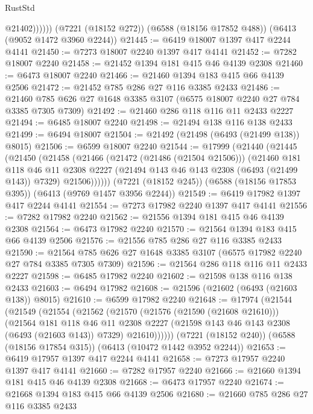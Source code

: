 \begin{lexlean}{RustStd}
\begin{coremodule}
                @21402))))))
    (@7221 (@18152 @272))
    (@6588 (@18156 @17852 @488))
    (@6413 (@9052 @1472 @3960 @2244))
@21445 := @6419 @18007 @1397 @417 @2244 @4141
@21450 := @7273 @18007 @2240 @1397 @417 @4141
@21452 := @7282 @18007 @2240
@21458 := @21452 @1394 @181 @415 @46 @4139 @2308
@21460 := @6473 @18007 @2240
@21466 := @21460 @1394 @183 @415 @66 @4139 @2506
@21472 := @21452 @785 @286 @27 @116 @3385 @2433
@21486 := @21460 @785 @626 @27 @1648 @3385 @3107 (@6575 @18007 @2240 @27 @784 @3385 @7305 @7309)
@21492 := @21460 @286 @118 @116 @11 @2433 @2227
@21494 := @6485 @18007 @2240
@21498 := @21494 @138 @116 @138 @2433
@21499 := @6494 @18007
@21504 := @21492 (@21498 (@6493 (@21499 @138)) @8015)
@21506 := @6599 @18007 @2240
@21544 := @17999
    (@21440
      (@21445
        (@21450
          (@21458
            (@21466
              (@21472 (@21486 (@21504 @21506)))
              (@21460
                @181
                @118
                @46
                @11
                @2308
                @2227
                (@21494 @143 @46 @143 @2308 (@6493 (@21499 @143)) @7329)
                @21506))))))
    (@7221 (@18152 @245))
    (@6588 (@18156 @17853 @395))
    (@6413 (@9769 @1457 @3956 @2244))
@21549 := @6419 @17982 @1397 @417 @2244 @4141
@21554 := @7273 @17982 @2240 @1397 @417 @4141
@21556 := @7282 @17982 @2240
@21562 := @21556 @1394 @181 @415 @46 @4139 @2308
@21564 := @6473 @17982 @2240
@21570 := @21564 @1394 @183 @415 @66 @4139 @2506
@21576 := @21556 @785 @286 @27 @116 @3385 @2433
@21590 := @21564 @785 @626 @27 @1648 @3385 @3107 (@6575 @17982 @2240 @27 @784 @3385 @7305 @7309)
@21596 := @21564 @286 @118 @116 @11 @2433 @2227
@21598 := @6485 @17982 @2240
@21602 := @21598 @138 @116 @138 @2433
@21603 := @6494 @17982
@21608 := @21596 (@21602 (@6493 (@21603 @138)) @8015)
@21610 := @6599 @17982 @2240
@21648 := @17974
    (@21544
      (@21549
        (@21554
          (@21562
            (@21570
              (@21576 (@21590 (@21608 @21610)))
              (@21564
                @181
                @118
                @46
                @11
                @2308
                @2227
                (@21598 @143 @46 @143 @2308 (@6493 (@21603 @143)) @7329)
                @21610))))))
    (@7221 (@18152 @240))
    (@6588 (@18156 @17854 @315))
    (@6413 (@10472 @1442 @3952 @2244))
@21653 := @6419 @17957 @1397 @417 @2244 @4141
@21658 := @7273 @17957 @2240 @1397 @417 @4141
@21660 := @7282 @17957 @2240
@21666 := @21660 @1394 @181 @415 @46 @4139 @2308
@21668 := @6473 @17957 @2240
@21674 := @21668 @1394 @183 @415 @66 @4139 @2506
@21680 := @21660 @785 @286 @27 @116 @3385 @2433

\end{coremodule}
\end{lexlean}
